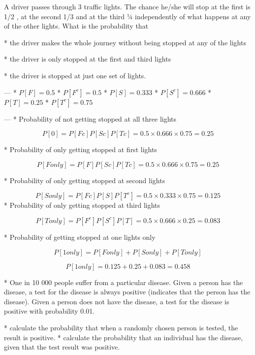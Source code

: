 \item
A driver passes through 3 traffic lights. The chance he/she will stop at the first is 1/2 , at the second 1/3 and at the third ¼ independently of what happens at any of the other lights. What is the probability that

\begin{enumerate}
*    the driver makes the whole journey without being stopped at any of the lights

*   the driver is only stopped at the first and third lights

*  the driver is stopped at just one set of lights.
\end{enumerate}

\begin{framed}
\begin{multicols}{3}
--- 
* $P[F] = 0.5 $  
* $P[F^c] = 0.5 $           
* $P[S] = 0.333 $       
* $P[S^c] = 0.666$
* $P[T] = 0.25  $      
* $P[T^c] = 0.75$

\end{multicols}


--- 
* Probability of not getting stopped at all three lights


\[P[0] =P[Fc]P[Sc]P[Tc] = 0.5 \times 0.666 \times 0.75 = 0.25\]


* Probability of only getting stopped at first  lights


\[P[F only] = P[F]P[Sc]P[Tc] = 0.5\times 0.666\times 0.75 = 0.25\]


* Probability of only getting stopped at second lights


\[P[S only] =P[Fc]P[S]P[T^c] = 0.5\times 0.333\times 0.75 = 0.125\]
* Probability of only getting stopped at third  lights

\[P[T only] =P[F^c]P[S^c]P[T] = 0.5\times 0.666\times 0.25 = 0.083\]


* Probability of getting stopped at one lights only 


\[P[1 only] =P[F only]+P[S only]+ P[T only]\]


\[P[1 only] = 0.125 + 0.25 + 0.083 = 0.458\]


\end{framed}


* One in 10 000 people suffer from a particular disease. Given a person has the disease, a test for the disease is always positive (indicates that the person has the disease). Given a person does not have the disease, a test for the disease is positive with probability 0.01.
\begin{enumerate}[(i)]
* calculate the probability that when a randomly chosen person is tested, the result is positive. 
* calculate the probability that an individual has the disease, given that the test result was positive.
\end{enumerate}

